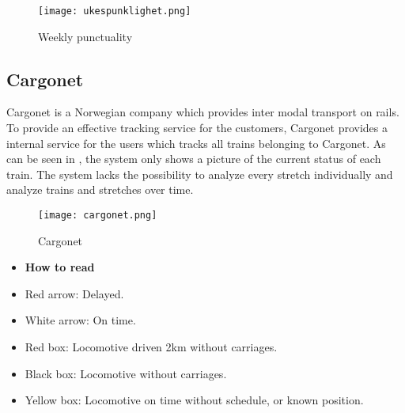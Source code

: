 \begin{figure}[!htbp]
	\texttt{[image: ukespunklighet.png]}
	\caption[Weekly punctuality]{Weekly punctuality\cite{sintefPresis}}
	\label{fig:ukespunklighet}
\end{figure}

\subsection{Cargonet} %
\label{sub:subsection_cargonet}

Cargonet is a Norwegian company which provides inter modal transport on rails. 
To provide an effective tracking service for the customers, Cargonet provides 
a internal service for the users which tracks all trains belonging to Cargonet.
As can be seen in , the system only shows a picture of the 
current status of each train. The system lacks the possibility to analyze 
every stretch individually and analyze trains and stretches over time.

\begin{figure}[!htbp]
	\texttt{[image: cargonet.png]}
	\caption[Cargonet]{Cargonet \cite{cargonet}}
	\label{fig:cargonet}
\end{figure}

\begin{itemize}
	\item [] \textbf{How to read }
	\item Red arrow:\hspace{4ex} Delayed.
	\item White arrow:\hspace{4ex} On time.
	\item Red box:\hspace{4ex} Locomotive driven 2km without carriages.
	\item Black box:\hspace{4ex} Locomotive without carriages.
	\item Yellow box:\hspace{4ex} Locomotive on time without schedule, or known position.
\end{itemize}


